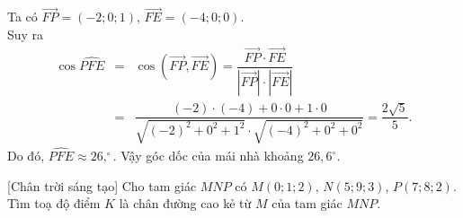\begin{bt}
{\begin{enumerate}
			Ta có $\overrightarrow{FP}=(-2;0;1)$, $\overrightarrow{FE}=(-4;0;0)$.\\
			Suy ra 
			\begin{eqnarray*}
				\cos \widehat{PFE}&=&\cos \left(\overrightarrow{FP},\overrightarrow{FE}\right)=\dfrac{\overrightarrow{FP}\cdot \overrightarrow{FE}}{\left|\overrightarrow{FP}\right|\cdot \left|\overrightarrow{FE}\right|}\\
				&=&\dfrac{(-2)\cdot (-4)+0\cdot 0+1\cdot 0}{\sqrt{(-2)^2+0^2+1^2}\cdot \sqrt{(-4)^2+0^2+0^2}}=\dfrac{2\sqrt{5}}{5}.
			\end{eqnarray*}
			Do đó, $\widehat{PFE}\approx 26{,}^\circ$. Vậy góc dốc của mái nhà khoảng $26{,}6^\circ$.
		\end{enumerate}
	}
\end{bt}

\begin{bt}%
[Chân trời sáng tạo]
	Cho tam giác $MNP$ có $M(0; 1; 2)$, $N(5; 9; 3)$, $P(7; 8; 2)$. Tìm toạ độ điểm $K$ là chân đường cao kẻ từ $M$ của tam giác $MNP$.
\end{bt}
